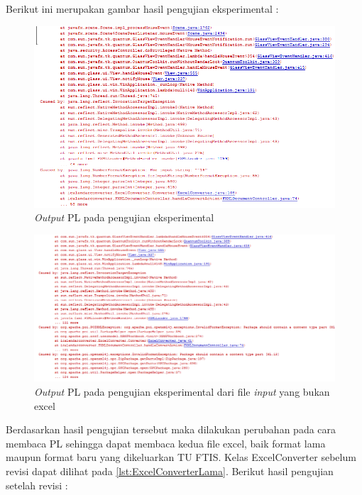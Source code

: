 Berikut ini merupakan gambar hasil pengujian eksperimental : 

			\begin{figure}[H]
			\centering
			\includegraphics[scale=0.6]{Gambar/eksperimental}
			\caption{\textit{Output} PL pada pengujian eksperimental }
			\label{fig:eksperimental}
			\end{figure}
	

			\begin{figure}[H]
			\centering
			\includegraphics[scale=0.6]{Gambar/eksperimental2}
			\caption{\textit{Output} PL pada pengujian eksperimental dari file \textit{input} yang bukan excel}
			\label{fig:eksperimental2}
			\end{figure}		


Berdasarkan hasil pengujian tersebut maka dilakukan perubahan pada cara membaca PL sehingga dapat membaca kedua file excel, baik format lama maupun format baru yang dikeluarkan TU FTIS. Kelas ExcelConverter sebelum revisi dapat dilihat pada \ref{lst:ExcelConverterLama}. Berikut hasil pengujian setelah revisi : 

